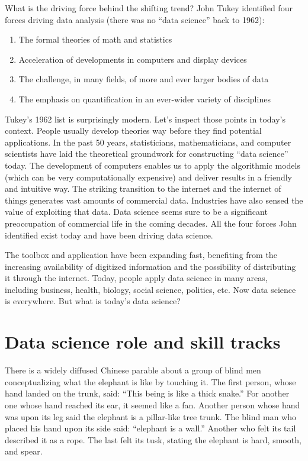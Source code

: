 \documentclass[
  12pt,
]{krantz}
\providecommand{\tightlist}{%
  \setlength{\itemsep}{0pt}\setlength{\parskip}{0pt}}
\begin{document}
What is the driving force behind the shifting trend? John Tukey identified four forces driving data analysis (there was no ``data science'' back to 1962):

\begin{enumerate}
\def\labelenumi{\arabic{enumi}.}
\tightlist
\item
  The formal theories of math and statistics
\item
  Acceleration of developments in computers and display devices
\item
  The challenge, in many fields, of more and ever larger bodies of data
\item
  The emphasis on quantification in an ever-wider variety of disciplines
\end{enumerate}

Tukey's 1962 list is surprisingly modern. Let's inspect those points in today's context. People usually develop theories way before they find potential applications. In the past 50 years, statisticians, mathematicians, and computer scientists have laid the theoretical groundwork for constructing ``data science'' today. The development of computers enables us to apply the algorithmic models (which can be very computationally expensive) and deliver results in a friendly and intuitive way. The striking transition to the internet and the internet of things generates vast amounts of commercial data. Industries have also sensed the value of exploiting that data. Data science seems sure to be a significant preoccupation of commercial life in the coming decades. All the four forces John identified exist today and have been driving data science.

The toolbox and application have been expanding fast, benefiting from the increasing availability of digitized information and the possibility of distributing it through the internet. Today, people apply data science in many areas, including business, health, biology, social science, politics, etc. Now data science is everywhere. But what is today's data science?

\hypertarget{data-science-role-and-skill-tracks}{%
\section{Data science role and skill tracks}\label{data-science-role-and-skill-tracks}}

There is a widely diffused Chinese parable about a group of blind men conceptualizing what the elephant is like by touching it. The first person, whose hand landed on the trunk, said: ``This being is like a thick snake.'' For another one whose hand reached its ear, it seemed like a fan. Another person whose hand was upon its leg said the elephant is a pillar-like tree trunk. The blind man who placed his hand upon its side said: ``elephant is a wall.'' Another who felt its tail described it as a rope. The last felt its tusk, stating the elephant is hard, smooth, and spear.
\end{document}
